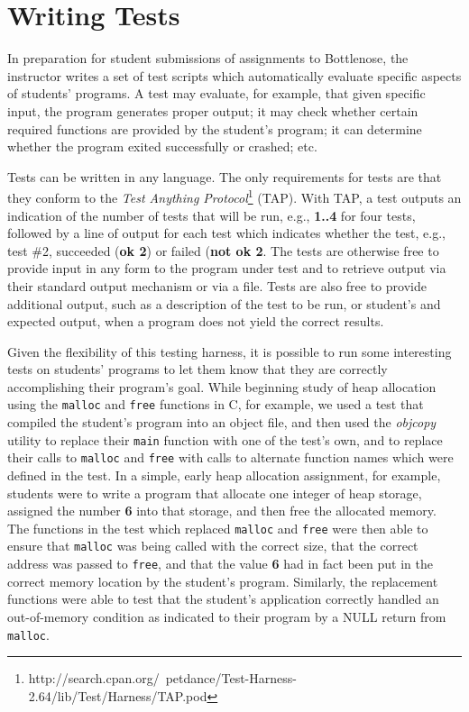 \section{Writing Tests}

In preparation for student submissions of assignments to Bottlenose, the
instructor writes a set of test scripts which automatically evaluate specific
aspects of students' programs. A test may evaluate, for example, that given
specific input, the program generates proper output; it may check whether
certain required functions are provided by the student's program; it can
determine whether the program exited successfully or crashed; etc.

Tests can be written in any language. The only requirements for tests are that
they conform to the \textit{Test Anything
  Protocol}\footnote{http://search.cpan.org/~petdance/Test-Harness-2.64/lib/Test/Harness/TAP.pod}
(TAP). With TAP, a test outputs an indication of the number of tests that will
be run, e.g., \textbf{1..4} for four tests, followed by a line of output for
each test which indicates whether the test, e.g., test \#2, succeeded
(\textbf{ok 2}) or failed (\textbf{not ok 2}. The tests are otherwise free to
provide input in any form to the program under test and to retrieve output via
their standard output mechanism or via a file. Tests are also free to provide
additional output, such as a description of the test to be run, or student's
and expected output, when a program does not yield the correct results.

Given the flexibility of this testing harness, it is possible to run some
interesting tests on students' programs to let them know that they are
correctly accomplishing their program's goal. While beginning study of heap
allocation using the \texttt{malloc} and \texttt{free} functions in C, for
example, we used a test that compiled the student's program into an object
file, and then used the \textit{objcopy} utility to replace their
\texttt{main} function with one of the test's own, and to replace their calls
to \texttt{malloc} and \texttt{free} with calls to alternate function names
which were defined in the test. In a simple, early heap allocation assignment,
for example, students were to write a program that allocate one integer of
heap storage, assigned the number \textbf{6} into that storage, and then free
the allocated memory. The functions in the test which replaced \texttt{malloc}
and \texttt{free} were then able to ensure that \texttt{malloc} was being
called with the correct size, that the correct address was passed to
\texttt{free}, and that the value \textbf{6} had in fact been put in the
correct memory location by the student's program. Similarly, the replacement
functions were able to test that the student's application correctly handled
an out-of-memory condition as indicated to their program by a NULL return from
\texttt{malloc}.


